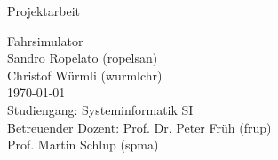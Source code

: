 %
%

\begin{titlepage}

\cleardoublepage

\vspace{4em}
\center

\Large{\textsf{Projektarbeit}}
\vspace{1em}

\Huge{\textsf{Fahrsimulator}}
\vspace{2em}
\\
\Large{
	\textsf{
		Sandro Ropelato (ropelsan)\\
		Christof Würmli (wurmlchr)\\
		\vspace{2em}
		\today\\
		\vspace{2em}
		Studiengang: Systeminformatik SI\\
		Betreuender Dozent: Prof. Dr. Peter Früh (frup)\\
		Prof. Martin Schlup (spma)	
	}
}

\end{titlepage}
